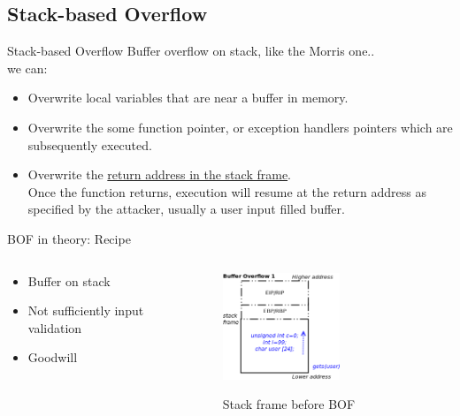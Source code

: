 \subsection{Stack-based Overflow}
\begin{frame}{Stack-based Overflow}
Buffer overflow on stack, like the Morris one..\\
we can:
\begin{itemize}
\item Overwrite local variables that are near a buffer in memory.
\item Overwrite the some function pointer, or exception handlers pointers which are subsequently executed.
\item Overwrite the \underline{return address in the stack frame}.\\ Once the function returns, execution will resume at the return address as specified by the attacker, usually a user input filled buffer.
	\end{itemize}

\framebreak

\begin{block}{BOF in theory: Recipe}
\begin{columns}[T]
	\begin{column}{.3\textwidth}
	\begin{itemize}
	\item Buffer on stack
	\item Not sufficiently input validation
	\item Goodwill
	\end{itemize}
    \end{column}
	\begin{column}{.7\textwidth}
	\begin{figure}
    \includegraphics[width=0.6\textwidth]{imgs/bof1.png}
    \label{fig:bof1}
    \caption{Stack frame before BOF}
    \end{figure}	
	\end{column}
\end{columns}	
\end{block}


\end{frame}
